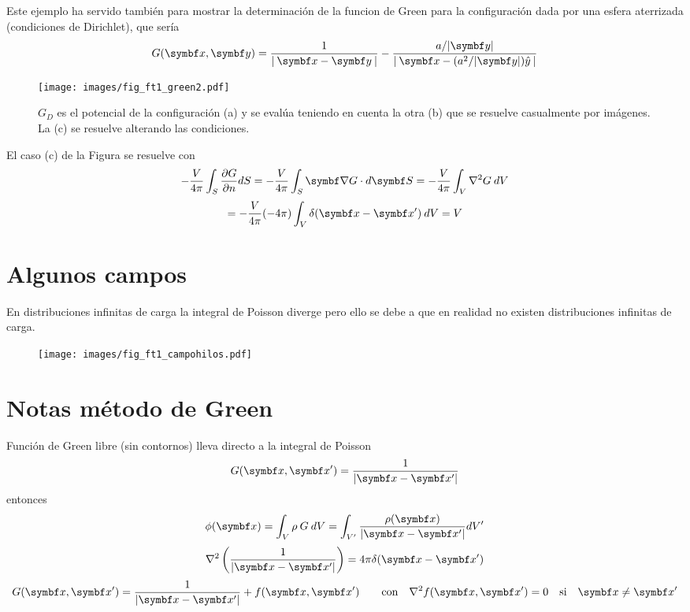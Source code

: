 \documentclass[10pt,oneside]{CBFT_book}
\begin{document}
Este ejemplo ha servido también para mostrar la determinación de la funcion de Green para la configuración
dada por una esfera aterrizada (condiciones de Dirichlet), que sería
\[
	G(\vbx,\vb{y}) = \frac{1}{| \: \vbx - \vb{y} \:|} - \frac{a/|\vb{y}|}{| \:\vbx - ( a^2 / |\vb{y}| ) \hat{y} \: |} 
\]

\begin{figure}[htb]
	\begin{center}
	\texttt{[image: images/fig\_ft1\_green2.pdf]}	 
	\end{center}
	\caption{$G_D$ es el potencial de la configuración (a) y se evalúa teniendo en cuenta la
	otra (b) que se resuelve casualmente por imágenes. La (c) se resuelve alterando las condiciones.}
\end{figure} 

El caso (c) de la Figura se resuelve con 
\[
	-\frac{V}{4\pi} \int_S \dpar{G}{n} dS = -\frac{V}{4\pi} \int_S \Nabla G\cdot d\vb{S} =
	-\frac{V}{4\pi} \int_V \lapm{G} \: dV	
\]
\[
	= -\frac{V}{4\pi} (-4\pi)\int_V \delta(\vb{x}-\vb{x}') \: dV	= V 
\]

\section{Algunos campos}

En distribuciones infinitas de carga la integral de Poisson diverge pero ello se debe a que en
realidad no existen distribuciones infinitas de carga.
\begin{figure}[thb]
	\begin{center}
	\texttt{[image: images/fig\_ft1\_campohilos.pdf]}	 
	\end{center}
	\caption{}
\end{figure} 

\section{Notas método de Green}

Función de Green libre (sin contornos) lleva directo a la integral de Poisson
\[
	G(\vb{x}, \vb{x}') = \frac{1}{|\vb{x} - \vb{x}'|}
\]
entonces 
\[
	\phi(\vb{x}) = \int_V \rho \:G \:dV = \int_{V'} \frac{ \rho(\vb{x}) }{|\vb{x}-\vb{x}'|} dV'
\]
\[
	\nabla^2 \left( \frac{1}{|\vb{x} - \vb{x}'|} \right) = 4\pi \delta(\vb{x}-\vb{x}')
\]
\[
	G(\vb{x}, \vb{x}') =  \frac{1}{|\vb{x} - \vb{x}'|} + f(\vb{x}, \vb{x}') \qquad 
	\textrm{con} \quad \lapm{f}(\vb{x}, \vb{x}') = 0 \quad \textrm{si} \quad \vb{x}\neq\vb{x}'
\]
\end{document}
